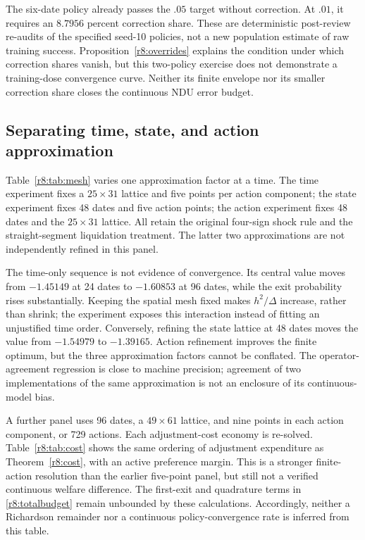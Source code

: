 The six-date policy already passes the $.05$ target without correction. At $.01$, it requires an $8.7956$ percent correction share. These are deterministic post-review re-audits of the specified seed-10 policies, not a new population estimate of raw training success. Proposition~\ref{r8:overrides} explains the condition under which correction shares vanish, but this two-policy exercise does not demonstrate a training-dose convergence curve. Neither its finite envelope nor its smaller correction share closes the continuous NDU error budget.

\subsection{Separating time, state, and action approximation}
Table~\ref{r8:tab:mesh} varies one approximation factor at a time. The time experiment fixes a $25\times31$ lattice and five points per action component; the state experiment fixes 48 dates and five action points; the action experiment fixes 48 dates and the $25\times31$ lattice. All retain the original four-sign shock rule and the straight-segment liquidation treatment. The latter two approximations are not independently refined in this panel.



The time-only sequence is not evidence of convergence. Its central value moves from $-1.45149$ at 24 dates to $-1.60853$ at 96 dates, while the exit probability rises substantially. Keeping the spatial mesh fixed makes $h^2/\Delta$ increase, rather than shrink; the experiment exposes this interaction instead of fitting an unjustified time order. Conversely, refining the state lattice at 48 dates moves the value from $-1.54979$ to $-1.39165$. Action refinement improves the finite optimum, but the three approximation factors cannot be conflated. The operator-agreement regression is close to machine precision; agreement of two implementations of the same approximation is not an enclosure of its continuous-model bias.

A further panel uses 96 dates, a $49\times61$ lattice, and nine points in each action component, or 729 actions. Each adjustment-cost economy is re-solved. Table~\ref{r8:tab:cost} shows the same ordering of adjustment expenditure as Theorem~\ref{r8:cost}, with an active preference margin. This is a stronger finite-action resolution than the earlier five-point panel, but still not a verified continuous welfare difference. The first-exit and quadrature terms in \eqref{r8:totalbudget} remain unbounded by these calculations. Accordingly, neither a Richardson remainder nor a continuous policy-convergence rate is inferred from this table.

